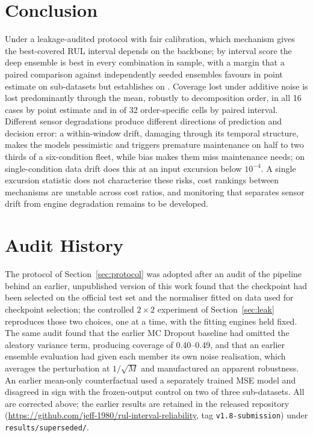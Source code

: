 \documentclass[journal]{IEEEtran}
\begin{document}
\section{Conclusion}
Under a leakage-audited protocol with fair calibration, which mechanism gives the best-covered RUL interval depends on the backbone; by interval score the deep ensemble is best in every combination in sample, with a margin that a paired comparison against independently seeded ensembles favours in point estimate on \NIndepPosN{} sub-datasets but establishes on \NIndepSigN. Coverage lost under additive noise is lost predominantly through the mean, robustly to decomposition order, in all 16 cases by point estimate and in \NCITot{} of 32 order-specific cells by paired interval. Different sensor degradations produce different directions of prediction and decision error: a within-window drift, damaging through its temporal structure, makes the models pessimistic and triggers premature maintenance on half to two thirds of a six-condition fleet, while bias makes them miss maintenance needs; on single-condition data drift does this at an input excursion below $10^{-4}$. A single excursion statistic does not characterise these risks, cost rankings between mechanisms are unstable across cost ratios, and monitoring that separates sensor drift from engine degradation remains to be developed.

\appendices
\section{Audit History}
\label{app:audit}
The protocol of Section~\ref{sec:protocol} was adopted after an audit of the pipeline behind an earlier, unpublished version of this work found that the checkpoint had been selected on the official test set and the normaliser fitted on data used for checkpoint selection; the controlled $2\times2$ experiment of Section~\ref{sec:leak} reproduces those two choices, one at a time, with the fitting engines held fixed. The same audit found that the earlier MC Dropout baseline had omitted the aleatory variance term, producing coverage of 0.40--0.49, and that an earlier ensemble evaluation had given each member its own noise realisation, which averages the perturbation at $1/\sqrt{M}$ and manufactured an apparent robustness. An earlier mean-only counterfactual used a separately trained MSE model and disagreed in sign with the frozen-output control on two of three sub-datasets. All are corrected above; the earlier results are retained in the released repository (\url{https://github.com/jeff-1980/rul-interval-reliability}, tag \texttt{v1.8-submission}) under \texttt{results/superseded/}.
\end{document}
